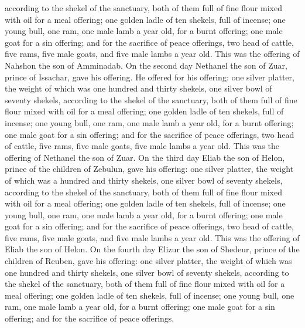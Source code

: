 according to the shekel of the sanctuary, both of them full of fine
flour mixed with oil for a meal offering;  one golden
ladle of ten shekels, full of incense;  one young bull,
one ram, one male lamb a year old, for a burnt offering; 
one male goat for a sin offering;  and for the sacrifice
of peace offerings, two head of cattle, five rams, five male goats, and
five male lambs a year old. This was the offering of Nahshon the son of
Amminadab.  On the second day Nethanel the son of Zuar,
prince of Issachar, gave his offering.  He offered for
his offering: one silver platter, the weight of which was one hundred
and thirty shekels, one silver bowl of seventy shekels, according to the
shekel of the sanctuary, both of them full of fine flour mixed with oil
for a meal offering;  one golden ladle of ten shekels,
full of incense;  one young bull, one ram, one male lamb
a year old, for a burnt offering;  one male goat for a
sin offering;  and for the sacrifice of peace offerings,
two head of cattle, five rams, five male goats, five male lambs a year
old. This was the offering of Nethanel the son of Zuar. 
On the third day Eliab the son of Helon, prince of the children of
Zebulun,  gave his offering: one silver platter, the
weight of which was a hundred and thirty shekels, one silver bowl of
seventy shekels, according to the shekel of the sanctuary, both of them
full of fine flour mixed with oil for a meal offering; 
one golden ladle of ten shekels, full of incense;  one
young bull, one ram, one male lamb a year old, for a burnt offering;
 one male goat for a sin offering;  and
for the sacrifice of peace offerings, two head of cattle, five rams,
five male goats, and five male lambs a year old. This was the offering
of Eliab the son of Helon.  On the fourth day Elizur the
son of Shedeur, prince of the children of Reuben,  gave
his offering: one silver platter, the weight of which was one hundred
and thirty shekels, one silver bowl of seventy shekels, according to the
shekel of the sanctuary, both of them full of fine flour mixed with oil
for a meal offering;  one golden ladle of ten shekels,
full of incense;  one young bull, one ram, one male lamb
a year old, for a burnt offering;  one male goat for a
sin offering;  and for the sacrifice of peace offerings,
